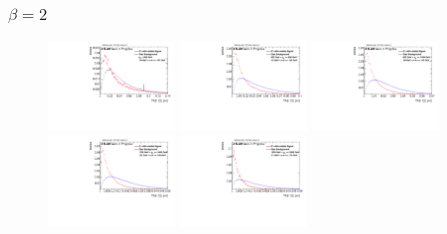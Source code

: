 \subsubsection*{$\beta=2$}
\begin{figure}[H]
\includegraphics[width=0.3\textwidth]{sascha_input/Appendix/Distributions/higgs/distributions/beta2/h_assisted_tj_C2_2_bin1.pdf} \hspace{1mm}
\includegraphics[width=0.3\textwidth]{sascha_input/Appendix/Distributions/higgs/distributions/beta2/h_assisted_tj_C2_2_bin2.pdf} \hspace{4mm}
\includegraphics[width=0.3\textwidth]{sascha_input/Appendix/Distributions/higgs/distributions/beta2/h_assisted_tj_C2_2_bin3.pdf} 
\bigskip
\includegraphics[width=0.3\textwidth]{sascha_input/Appendix/Distributions/higgs/distributions/beta2/h_assisted_tj_C2_2_bin4.pdf} \hspace{4mm}
\includegraphics[width=0.3\textwidth]{sascha_input/Appendix/Distributions/higgs/distributions/beta2/h_assisted_tj_C2_2_bin5.pdf} 


\end{figure}
